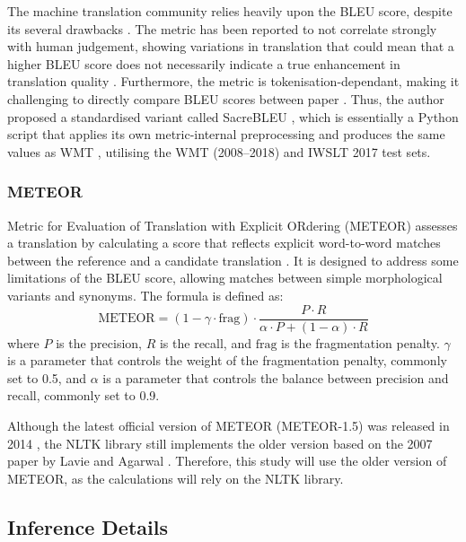 \documentclass[a4paper, 11pt]{article}
\begin{document}
The machine translation community relies heavily upon the BLEU score, despite its several drawbacks \cite{lommel-2016-blues}. The metric has been reported to not correlate strongly with human judgement, showing variations in translation that could mean that a higher BLEU score does not necessarily indicate a true enhancement in translation quality \cite{callison-burch-2006-reevaluating-bleu}. Furthermore, the metric is tokenisation-dependant, making it challenging to directly compare BLEU scores between paper \cite{post-2018-sacrebleu}. Thus, the author proposed a standardised variant called SacreBLEU \cite{post-2018-sacrebleu}, which is essentially a Python script that applies its own metric-internal preprocessing and produces the same values as WMT \cite{barrault-2020-wmt}, utilising the WMT (2008–2018) and IWSLT 2017 \cite{cettolo-etal-2017-iwslt} test sets.

\subsubsection{METEOR}

Metric for Evaluation of Translation with Explicit ORdering (METEOR) \cite{lavie-2007-meteor} assesses a translation by calculating a score that reflects explicit word-to-word matches between the reference and a candidate translation \cite{agarwal-2008-meteor-mbleu-mter}. It is designed to address some limitations of the BLEU score, allowing matches between simple morphological variants and synonyms. The formula is defined as:
\begin{equation}
    \text{METEOR} = (1 - \gamma \cdot \text{frag}) \cdot \frac{P \cdot R}{\alpha \cdot P + (1 - \alpha) \cdot R}
\end{equation}
where \(P\) is the precision, \(R\) is the recall, and \(\text{frag}\) is the fragmentation penalty. \(\gamma\) is a parameter that controls the weight of the fragmentation penalty, commonly set to 0.5, and \(\alpha\) is a parameter that controls the balance between precision and recall, commonly set to 0.9.

Although the latest official version of METEOR (METEOR-1.5) was released in 2014 \cite{denkowski-lavie-2014-meteor-universal}, the NLTK library \cite{bird-2009-natural} still implements the older version based on the 2007 paper by Lavie and Agarwal \cite{lavie-2007-meteor}. Therefore, this study will use the older version of METEOR, as the calculations will rely on the NLTK library.

\subsection{Inference Details}
\end{document}
